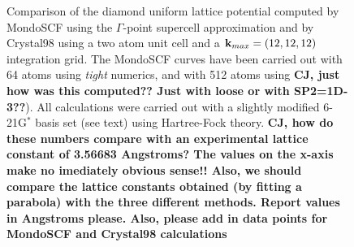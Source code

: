 \documentclass[prb,aps,nobibnotes,twocolumn,doublespace,twocolumngrid,superbib]{revtex4}
\begin{document}
\begin{figure}
\caption{Comparison of the diamond uniform lattice potential computed 
by MondoSCF using the $\Gamma$-point supercell approximation and by {\sc Crystal98}
using a two atom unit cell and a ${\bf k}_{max} = (12,12,12)$ integration grid.
The {\sc MondoSCF} curves have been carried out with 64 atoms using {\it tight}
numerics, and with 512 atoms using {\bf CJ, just how was this computed?? Just with 
loose or with SP2=1D-3??}).  All calculations were carried out with a slightly 
modified 6-21G$^*$ basis set (see text) using Hartree-Fock theory.
{\bf CJ, how do these numbers compare with an experimental lattice constant 
of 3.56683 Angstroms?  The values on the x-axis make no imediately obvious sense!!
Also, we should compare the lattice constants obtained (by fitting a parabola) 
with the three different methods. Report values in Angstroms please.  Also, please add in
data points for MondoSCF and Crystal98 calculations}}
\label{CarbonEnergyVsLattice}
\end{figure}

\pagebreak
\end{document}
